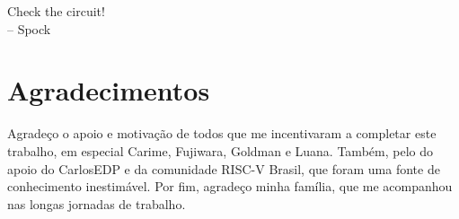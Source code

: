

\begin{dedicatoria}
    Check the circuit! \\
    – Spock
    \end{dedicatoria}
    
    
    \chapter*{Agradecimentos}
    
    Agradeço o apoio e motivação de todos que me incentivaram a completar 
    este trabalho, em especial Carime, Fujiwara, Goldman e Luana. 
    Também, pelo do apoio do CarlosEDP e da comunidade RISC-V Brasil, que
    foram uma fonte de conhecimento inestimável.
    Por fim, agradeço minha família, que me acompanhou nas longas jornadas de trabalho.
    
    \printResumoAbstract
    
    
    
    \makeatletter
    \if@openright\cleardoublepage\else\clearpage\fi
    \makeatother
    
    
